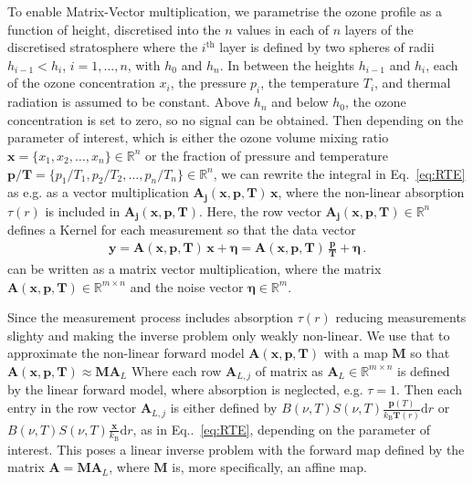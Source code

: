 To enable Matrix-Vector multiplication, we parametrise the ozone profile as a function of height, discretised into the $n$ values in each of $n$ layers of the discretised stratosphere where the $i^\text{th}$ layer is defined by two spheres of radii  $h_{i-1} < h_{i}$, $i = 1, \dots, n$, with $h_0$ and $h_{n} $.
In between the heights $h_{i-1}$ and $h_{i}$, each of the ozone concentration $x_{i}$, the pressure $p_{i}$, the temperature $T_{i}$, and thermal radiation is assumed to be constant.
Above $h_{n}$ and below $h_0$, the ozone concentration is set to zero, so no signal can be obtained.
Then depending on the parameter of interest, which is either the ozone volume mixing ratio $\bm{x} =\{x_1,x_2,\ldots,x_n\} \in \mathbb{R}^{n}$ or the fraction of pressure and temperature $\bm{p/T}= \{p_1/T_1,p_2/T_2,\ldots,p_n/T_n\} \in \mathbb{R}^{n} $, we can rewrite the integral in Eq.~\eqref{eq:RTE} as e.g. as a vector multiplication $\bm{A_{j}}(\bm{x},  \bm{p},\bm{T}) \, \bm{x} $, where the non-linear absorption $\tau(r)$ is included in $\bm{A_{j}}(\bm{x},  \bm{p},\bm{T})$.
Here, the row vector $\bm{A_{j}}(\bm{x},  \bm{p},\bm{T}) \in \mathbb{R}^{n}$  defines a Kernel for each measurement so that the data vector
\begin{align}
	\bm{y} = \bm{A}(\bm{x},  \bm{p},\bm{T}) \, \bm{x} + \bm{\eta}= \bm{A}(\bm{x},  \bm{p},\bm{T}) \,
	\frac{ \bm{p}}{\bm{T}} + \bm{\eta} \, .
\end{align}
can be written as a matrix vector multiplication, where the matrix $\bm{A}(\bm{x},  \bm{p},\bm{T}) \in \mathbb{R}^{m \times n}$  and the noise vector $\bm{\eta} \in \mathbb{R}^{m}$.

Since the measurement process includes absorption $\tau(r)$ reducing measurements slighty and making the inverse problem only weakly non-linear. 
We use that to approximate the non-linear forward model $\bm{A}(\bm{x},  \bm{p},\bm{T})$ with a map $\bm{M}$ so that $\bm{A}(\bm{x},  \bm{p},\bm{T}) \approx \bm{M} \bm{A}_L $
Where each row $\bm{A}_{L,j} $ of matrix as $\bm{A}_L \in \mathbb{R}^{m \times n}$ is defined by the linear forward model, where absorption is neglected, e.g. $\tau = 1$. 
Then each entry in the row vector $\bm{A}_{L,j} $ is either defined by $ B(\nu,T) S(\nu, T)   \frac{\bm{p}(T)}{k_{\text{B}} \bm{T}(r)}  \text{d}r$ or $B(\nu,T) S(\nu, T)   \frac{\bm{x}}{k_{\text{B}}}  \text{d}r$, as in Eq..~\eqref{eq:RTE}, depending on the parameter of interest.
This poses a linear inverse problem with the forward map defined by the matrix $\bm{A} = \bm{M} \bm{A}_L$, where $\bm{M}$ is, more specifically, an affine map.


